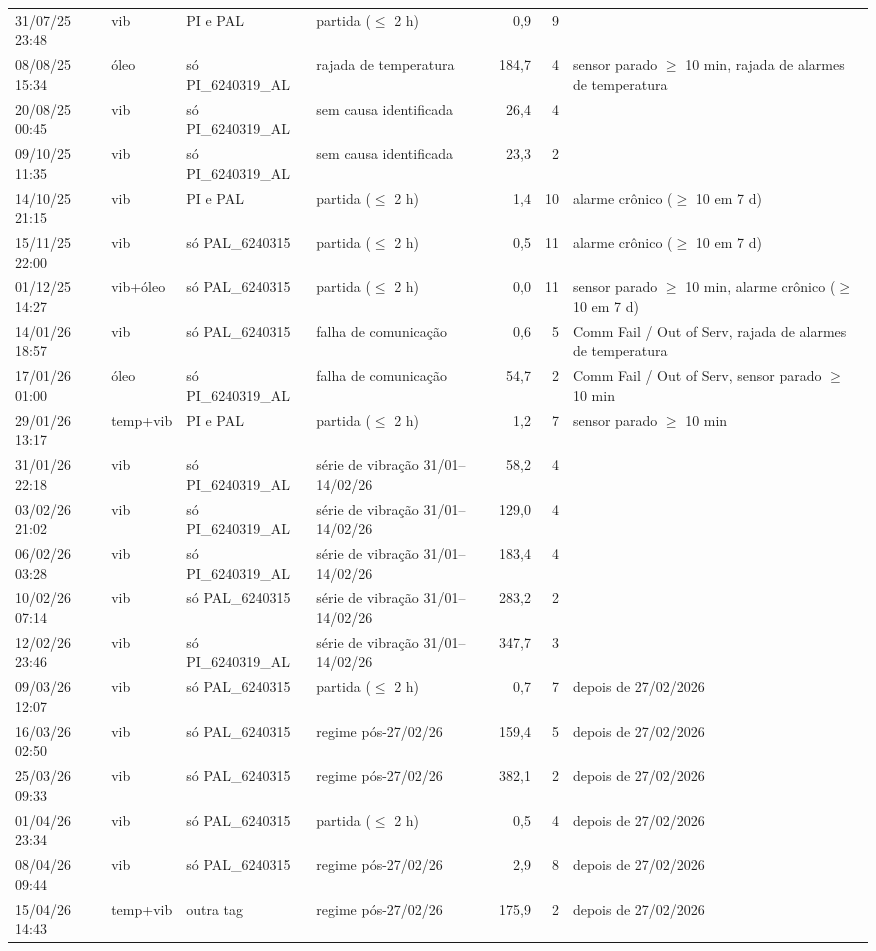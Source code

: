 \begin{longtable}{l >{\raggedright\arraybackslash}p{1.4cm} >{\raggedright\arraybackslash}p{2.4cm} >{\raggedright\arraybackslash}p{2.9cm} r r >{\raggedright\arraybackslash}p{3.6cm}}
31/07/25 23:48 & vib & PI e PAL & partida ($\leq$ 2 h) & 0,9 & 9 &  \\
08/08/25 15:34 & óleo & só PI\_6240319\_AL & rajada de temperatura & 184,7 & 4 & sensor parado $\geq$ 10 min, rajada de alarmes de temperatura \\
20/08/25 00:45 & vib & só PI\_6240319\_AL & sem causa identificada & 26,4 & 4 &  \\
09/10/25 11:35 & vib & só PI\_6240319\_AL & sem causa identificada & 23,3 & 2 &  \\
14/10/25 21:15 & vib & PI e PAL & partida ($\leq$ 2 h) & 1,4 & 10 & alarme crônico ($\geq$ 10 em 7 d) \\
15/11/25 22:00 & vib & só PAL\_6240315 & partida ($\leq$ 2 h) & 0,5 & 11 & alarme crônico ($\geq$ 10 em 7 d) \\
01/12/25 14:27 & vib+óleo & só PAL\_6240315 & partida ($\leq$ 2 h) & 0,0 & 11 & sensor parado $\geq$ 10 min, alarme crônico ($\geq$ 10 em 7 d) \\
14/01/26 18:57 & vib & só PAL\_6240315 & falha de comunicação & 0,6 & 5 & Comm Fail / Out of Serv, rajada de alarmes de temperatura \\
17/01/26 01:00 & óleo & só PI\_6240319\_AL & falha de comunicação & 54,7 & 2 & Comm Fail / Out of Serv, sensor parado $\geq$ 10 min \\
29/01/26 13:17 & temp+vib & PI e PAL & partida ($\leq$ 2 h) & 1,2 & 7 & sensor parado $\geq$ 10 min \\
31/01/26 22:18 & vib & só PI\_6240319\_AL & série de vibração 31/01–14/02/26 & 58,2 & 4 &  \\
03/02/26 21:02 & vib & só PI\_6240319\_AL & série de vibração 31/01–14/02/26 & 129,0 & 4 &  \\
06/02/26 03:28 & vib & só PI\_6240319\_AL & série de vibração 31/01–14/02/26 & 183,4 & 4 &  \\
10/02/26 07:14 & vib & só PAL\_6240315 & série de vibração 31/01–14/02/26 & 283,2 & 2 &  \\
12/02/26 23:46 & vib & só PI\_6240319\_AL & série de vibração 31/01–14/02/26 & 347,7 & 3 &  \\
09/03/26 12:07 & vib & só PAL\_6240315 & partida ($\leq$ 2 h) & 0,7 & 7 & depois de 27/02/2026 \\
16/03/26 02:50 & vib & só PAL\_6240315 & regime pós-27/02/26 & 159,4 & 5 & depois de 27/02/2026 \\
25/03/26 09:33 & vib & só PAL\_6240315 & regime pós-27/02/26 & 382,1 & 2 & depois de 27/02/2026 \\
01/04/26 23:34 & vib & só PAL\_6240315 & partida ($\leq$ 2 h) & 0,5 & 4 & depois de 27/02/2026 \\
08/04/26 09:44 & vib & só PAL\_6240315 & regime pós-27/02/26 & 2,9 & 8 & depois de 27/02/2026 \\
15/04/26 14:43 & temp+vib & outra tag & regime pós-27/02/26 & 175,9 & 2 & depois de 27/02/2026 \\
\bottomrule
\end{longtable}
